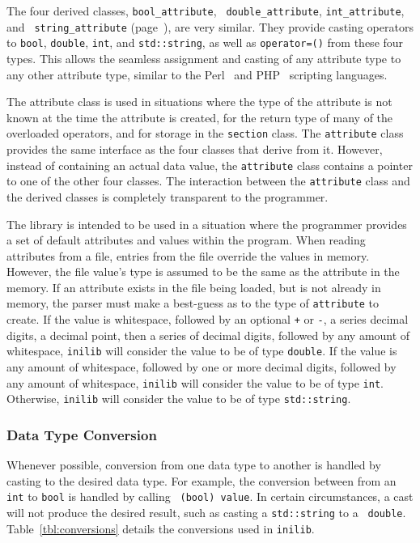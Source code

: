 The four derived classes, {\tt bool\_\-attribute}, {\tt
  double\_\-attribute}, {\tt int\_\-attribute}, and {\tt
  string\_\-attribute} (page~\pageref{sec:attribute}), are very
similar.  They provide casting operators to {\tt bool}, {\tt double},
{\tt int}, and {\tt std::string}, as well as {\tt operator=()} from these
four types.  This allows the seamless assignment and casting of any
attribute type to any other attribute type, similar to the
Perl~\cite{perl} and PHP~\cite{php} scripting languages.

The attribute class is used in situations where the type of the
attribute is not known at the time the attribute is created, for the
return type of many of the overloaded operators, and for storage in
the {\tt section} class.  The {\tt attribute} class provides the same
interface as the four classes that derive from it.  However, instead
of containing an actual data value, the {\tt attribute} class contains
a pointer to one of the other four classes.  The interaction between
the {\tt attribute} class and the derived classes is completely
transparent to the programmer.

The library is intended to be used in a situation where the programmer
provides a set of default attributes and values within the program.
When reading attributes from a file, entries from the file override
the values in memory.  However, the file value's type is assumed to be
the same as the attribute in the memory.  If an attribute exists in
the file being loaded, but is not already in memory, the parser must
make a best-guess as to the type of {\tt attribute} to create.  If the
value is whitespace, followed by an optional {\tt +} or {\tt -}, a
series decimal digits, a decimal point, then a series of decimal
digits, followed by any amount of whitespace, {\tt inilib} will
consider the value to be of type {\tt double}.  If the value is any
amount of whitespace, followed by one or more decimal digits, followed
by any amount of whitespace, {\tt inilib} will consider the value to
be of type {\tt int}.  Otherwise, {\tt inilib} will consider the value
to be of type {\tt std::string}.

\subsubsection{Data Type Conversion}
\label{sec:conversions}

Whenever possible, conversion from one data type to another is handled
by casting to the desired data type.  For example, the conversion
between from an {\tt int} to {\tt bool} is handled by calling {\tt
(bool) value}.  In certain circumstances, a cast will not produce the
desired result, such as casting a {\tt std::string} to a {\tt
double}.  Table~\ref{tbl:conversions} details the conversions used in
{\tt inilib}.

